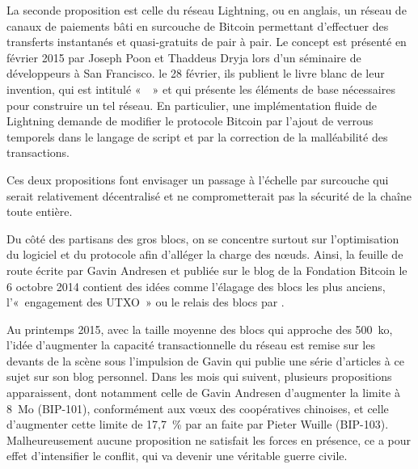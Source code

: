 La seconde proposition est celle du réseau Lightning, ou  en anglais, un réseau de canaux de paiements bâti en surcouche de Bitcoin permettant d'effectuer des transferts instantanés et quasi-gratuits de pair à pair. Le concept est présenté en février 2015 par Joseph Poon et Thaddeus Dryja lors d'un séminaire de développeurs à San Francisco. le 28 février, ils publient le livre blanc de leur invention, qui est intitulé «~~» et qui présente les éléments de base nécessaires pour construire un tel réseau. En particulier, une implémentation fluide de Lightning demande de modifier le protocole Bitcoin par l'ajout de verrous temporels dans le langage de script et par la correction de la malléabilité des transactions.

Ces deux propositions font envisager un passage à l'échelle par surcouche qui serait relativement décentralisé et ne comprometterait pas la sécurité de la chaîne toute entière.

Du côté des partisans des gros blocs, on se concentre surtout sur l'optimisation du logiciel et du protocole afin d'alléger la charge des nœuds. Ainsi, la feuille de route écrite par Gavin Andresen et publiée sur le blog de la Fondation Bitcoin le 6 octobre 2014 contient des idées comme l'élagage des blocs les plus anciens, l'«~engagement des UTXO~» ou le relais des blocs par .

Au printemps 2015, avec la taille moyenne des blocs qui approche des 500~ko, l'idée d'augmenter la capacité transactionnelle du réseau est remise sur les devants de la scène sous l'impulsion de Gavin qui publie une série d'articles à ce sujet sur son blog personnel. Dans les mois qui suivent, plusieurs propositions apparaissent, dont notamment celle de Gavin Andresen d'augmenter la limite à 8~Mo (BIP-101), conformément aux vœux des coopératives chinoises, et celle d'augmenter cette limite de 17,7~\% par an faite par Pieter Wuille (BIP-103). Malheureusement aucune proposition ne satisfait les forces en présence, ce a pour effet d'intensifier le conflit, qui va devenir une véritable guerre civile.

